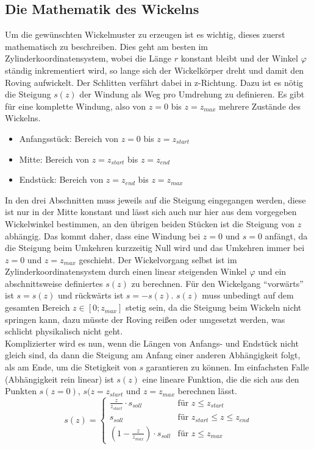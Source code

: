 \documentclass[paper=A4,pagesize,DIV=18, 12pt,listof=totoc,bibliography=totoc,headings=optiontohead,open=any]{article}
\begin{document}
\subsection{Die Mathematik des Wickelns}
\label{mathematik}
Um die gewünschten Wickelmuster zu erzeugen ist es wichtig, dieses zuerst mathematisch zu beschreiben. Dies geht am besten im Zylinderkoordinatensystem, wobei die Länge $r$ konstant bleibt und der Winkel $\varphi$ ständig inkrementiert wird, so lange sich der Wickelkörper dreht und damit den Roving aufwickelt. Der Schlitten verfährt dabei in z-Richtung. Dazu ist es nötig die Steigung $s(z)$ der Windung als Weg pro Umdrehung zu definieren. Es gibt für eine komplette Windung, also von $z = 0$ bis $z = z_{max}$ mehrere Zustände des Wickelns.\\
\begin{itemize}
	\item Anfangsstück: Bereich von $z = 0$ bis $z = z_{start}$
	\item Mitte: Bereich von $z = z_{start}$ bis $z = z_{end}$
	\item Endstück: Bereich von $z = z_{end}$ bis $z = z_{max}$
\end{itemize}
In den drei Abschnitten muss jeweils auf die Steigung eingegangen werden, diese ist nur in der Mitte konstant und lässt sich auch nur hier aus dem vorgegeben Wickelwinkel bestimmen, an den übrigen beiden Stücken ist die Steigung von $z$ abhängig. Das kommt daher, dass eine Windung bei $z = 0$ und $s = 0$ anfängt, da die Steigung beim Umkehren kurzzeitig Null wird und das Umkehren immer bei $z = 0$ und $z = z_{max}$ geschieht. Der Wickelvorgang selbst ist im Zylinderkoordinatensystem durch einen linear steigenden Winkel $\varphi$ und ein abschnittsweise definiertes $s(z)$ zu berechnen. Für den Wickelgang \enquote{vorwärts} ist $s = s(z)$ und rückwärts ist $s = -s(z)$. $s(z)$ muss unbedingt auf dem gesamten Bereich $z \in [0; z_{max}]$ stetig sein, da die Steigung beim Wickeln nicht springen kann, dazu müsste der Roving reißen oder umgesetzt werden, was schlicht physikalisch nicht geht.\\
Komplizierter wird es nun, wenn die Längen von Anfangs- und Endstück nicht gleich sind, da dann die Steigung am Anfang einer anderen Abhängigkeit folgt, als am Ende, um die Stetigkeit von $s$ garantieren zu können. Im einfachsten Falle (Abhängigkeit rein linear) ist $s(z)$ eine lineare Funktion, die die sich aus den Punkten $s(z = 0)$, $s(z = z_{start}$ und $z = z_{max}$ berechnen lässt.\\
\begin{equation}\label{steigungHin}
	s(z)=
	\begin{cases}
		\frac{z}{z_{start}} \cdot s_{soll} & \text{für } z \leq z_{start}\\
		s_{soll} & \text{für } z_{start} \leq z \leq z_{end}\\
		\left( 1 - \frac{z}{z_{max}}\right) \cdot s_{soll} & \text{für } z \leq z_{max}
	\end{cases}	
\end{equation}\\
\end{document}
